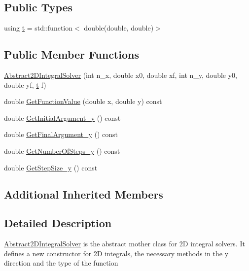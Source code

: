 \subsection*{Public Types}
\begin{DoxyCompactItemize}
\item 
using \hyperlink{class_abstract2_d_integral_solver_ab660df32953c6b0f9f3a45a8720eaeb3}{t} = std\+::function$<$ double(double, double)$>$
\end{DoxyCompactItemize}
\subsection*{Public Member Functions}
\begin{DoxyCompactItemize}
\item 
\hyperlink{class_abstract2_d_integral_solver_ad25b34f07befbbad7d3ec2b76d47b2b7}{Abstract2\+D\+Integral\+Solver} (int n\+\_\+x, double x0, double xf, int n\+\_\+y, double y0, double yf, \hyperlink{class_abstract2_d_integral_solver_ab660df32953c6b0f9f3a45a8720eaeb3}{t} f)
\item 
double \hyperlink{class_abstract2_d_integral_solver_a925351cc0ac65900e7ff42fd9d7e6973}{Get\+Function\+Value} (double x, double y) const
\item 
double \hyperlink{class_abstract2_d_integral_solver_a337907e938e5aa286618fd582b7b304e}{Get\+Initial\+Argument\+\_\+y} () const
\item 
double \hyperlink{class_abstract2_d_integral_solver_ab4a24610598fa26556c60c449d757b65}{Get\+Final\+Argument\+\_\+y} () const
\item 
double \hyperlink{class_abstract2_d_integral_solver_ad82316695f57ad589714598617c7784d}{Get\+Number\+Of\+Steps\+\_\+y} () const
\item 
double \hyperlink{class_abstract2_d_integral_solver_a5c23a838a4db9b607140d4d5f03b4f79}{Get\+Step\+Size\+\_\+y} () const
\end{DoxyCompactItemize}
\subsection*{Additional Inherited Members}


\subsection{Detailed Description}
\hyperlink{class_abstract2_d_integral_solver}{Abstract2\+D\+Integral\+Solver} is the abstract mother class for 2D integral solvers. It defines a new constructor for 2D integrals, the necessary methods in the y direction and the type of the function 


